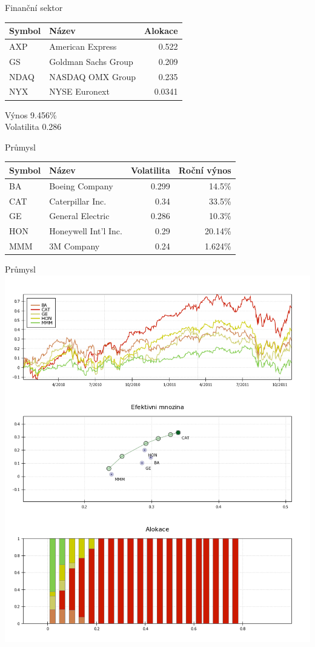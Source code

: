 \begin{frame}{Finanční sektor}
      \begin{tabular}{|l|l|r|}
        \hline
        Symbol&Název&Alokace\\\hline\hline
        AXP&American Express &0.522\\\hline
        GS&Goldman Sachs Group &0.209\\\hline
        NDAQ&NASDAQ OMX Group &0.235\\\hline
        NYX&NYSE Euronext &0.0341\\\hline
      \end{tabular}
      
      Výnos 9.456\%\\
      Volatilita 0.286
\end{frame}

\begin{frame}{Průmysl}
      \begin{tabular}{|l|l|r|r|}
        \hline
        Symbol&Název&Volatilita&Roční výnos\\\hline\hline
        BA&Boeing Company &0.299&14.5\%\\\hline
        CAT&Caterpillar Inc. &0.34&33.5\%\\\hline
        GE&General Electric &0.286&10.3\%\\\hline
        HON&Honeywell Int'l Inc. &0.29&20.14\%\\\hline
        MMM&3M Company &0.24&1.624\%\\\hline
      \end{tabular}
\end{frame}

\begin{frame}{Průmysl}
        \includegraphics[height=0.9\textheight]{ind1.png}
\end{frame}

